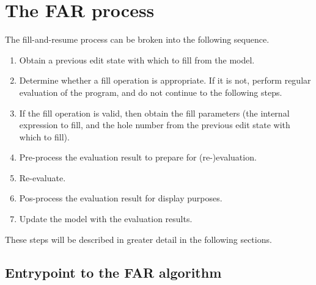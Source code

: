 \section{The FAR process}
\label{sec:far-process}

The fill-and-resume process can be broken into the following sequence.

\begin{enumerate}
\item Obtain a previous edit state with which to fill from the model.
\item Determine whether a fill operation is appropriate. If it is not, perform regular evaluation of the program, and do not continue to the following steps.
\item If the fill operation is valid, then obtain the fill parameters (the internal expression to fill, and the hole number from the previous edit state with which to fill).
\item Pre-process the evaluation result to prepare for (re-)evaluation.
\item Re-evaluate.
\item Pos-process the evaluation result for display purposes.
\item Update the model with the evaluation results.
\end{enumerate}

These steps will be described in greater detail in the following sections.

\subsection{Entrypoint to the FAR algorithm}
\label{sec:far-entrypoint}


